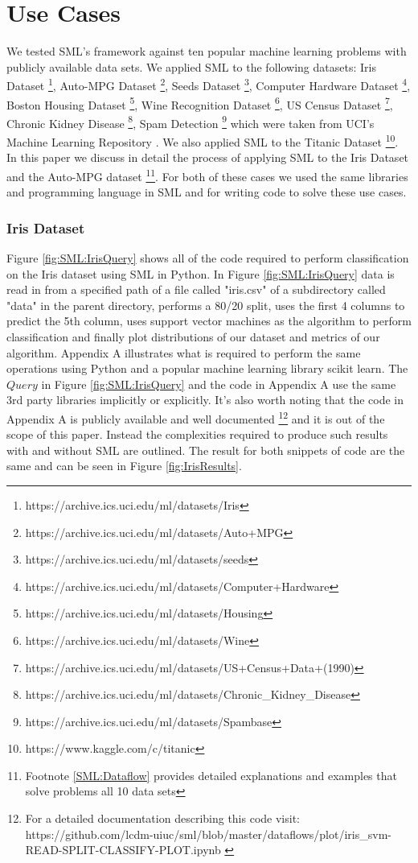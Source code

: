 \documentclass[jair,twoside,11pt,theapa]{article}
\begin{document}
\section{Use Cases}
\label{use-cases}

We tested SML's framework against ten popular machine learning problems with publicly available data sets. We applied SML to the following datasets: Iris Dataset \footnote{https://archive.ics.uci.edu/ml/datasets/Iris}, Auto-MPG Dataset \footnote{https://archive.ics.uci.edu/ml/datasets/Auto+MPG}, Seeds Dataset \footnote{https://archive.ics.uci.edu/ml/datasets/seeds}, Computer Hardware Dataset \footnote{https://archive.ics.uci.edu/ml/datasets/Computer+Hardware}, Boston Housing Dataset \footnote{https://archive.ics.uci.edu/ml/datasets/Housing}, Wine Recognition Dataset \footnote{https://archive.ics.uci.edu/ml/datasets/Wine}, US Census Dataset \footnote{https://archive.ics.uci.edu/ml/datasets/US+Census+Data+(1990)}, Chronic Kidney Disease \footnote{https://archive.ics.uci.edu/ml/datasets/Chronic\_Kidney\_Disease}, Spam Detection \footnote{https://archive.ics.uci.edu/ml/datasets/Spambase} which were taken from UCI's Machine Learning Repository \cite{Lichman:2013}. We also applied SML to the Titanic Dataset \footnote{https://www.kaggle.com/c/titanic}. In this paper we discuss in detail the process of applying SML to the Iris Dataset and the Auto-MPG dataset \footnote{Footnote \ref{SML:Dataflow} provides detailed explanations and examples that solve problems all 10 data sets}. For both of these cases we used the same libraries and programming language in SML and for writing code to solve these use cases.

\subsubsection{Iris Dataset}
Figure \ref{fig:SML:IrisQuery} shows all of the code required to perform classification on the Iris dataset using SML in Python. In Figure \ref{fig:SML:IrisQuery} data is read in from a specified path of a file called "iris.csv" of a subdirectory called "data" in the parent directory, performs a 80/20 split, uses the first 4 columns to predict the 5th column, uses support vector machines as the algorithm to perform classification and finally plot distributions of our dataset  and metrics of our algorithm. Appendix A illustrates what is required to perform the same operations using Python and a popular machine learning library scikit learn. The \(Query\) in Figure \ref{fig:SML:IrisQuery} and the code in Appendix A use the same 3rd party libraries implicitly or explicitly. It's also worth noting that the code in Appendix A is publicly available and well documented \footnote{For a detailed documentation describing this code visit: https://github.com/lcdm-uiuc/sml/blob/master/dataflows/plot/iris\_svm-READ-SPLIT-CLASSIFY-PLOT.ipynb \label{lab:iris:git}} and it is out of the scope of this paper. Instead the complexities required to produce such results with and without SML are outlined. The result for both snippets of code are the same and can be seen in Figure \ref{fig:IrisResults}.
\end{document}
